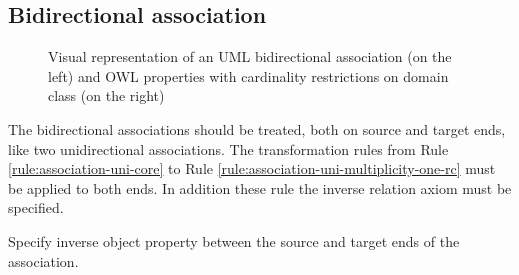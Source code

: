 \subsection{Bidirectional association}
\label{sec:association-bi}

\begin{figure}[!ht]
	\centering
	\begin{subfigure}{.21\textwidth}
		\centering
	\end{subfigure}%
	\begin{subfigure}{.8\textwidth}
		\centering
	\end{subfigure}
	\caption{Visual representation of an UML bidirectional association (on the left) and OWL properties with cardinality restrictions on domain class (on the right)}
	\label{fig:association-bi-visual}
\end{figure}

\enlargethispage{2em}
The bidirectional associations should be treated, both on source and target ends, like two unidirectional associations. The transformation rules from Rule \ref{rule:association-uni-core} to Rule \ref{rule:association-uni-multiplicity-one-rc} must be applied to both ends. In addition these rule the inverse relation axiom must be specified. 

\begin{trule}
	\label{rule:association-bi-inverse-rc}
	Specify inverse object property between the source and target ends of the association. 
\end{trule}

